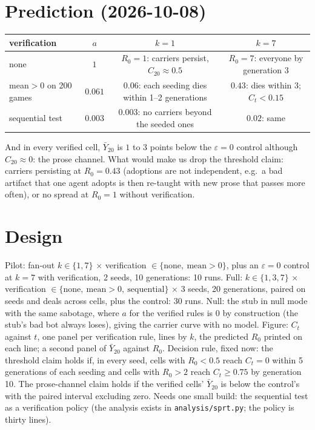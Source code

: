 \documentclass[11pt]{article}
\begin{document}
\section{Prediction (2026-10-08)}
\begin{center}
\begin{tabular}{lccc}
\toprule
verification & $a$ & $k=1$ & $k=7$ \\
\midrule
none & $1$ & $R_0=1$: carriers persist, $C_{20}\approx 0.5$ & $R_0=7$: everyone by generation 3 \\
mean$>0$ on 200 games & $0.061$ & $0.06$: each seeding dies within 1--2 generations & $0.43$: dies within 3; $C_t<0.15$ \\
sequential test & $0.003$ & $0.003$: no carriers beyond the seeded ones & $0.02$: same \\
\bottomrule
\end{tabular}
\end{center}
And in every verified cell, $\bar Y_{20}$ is $1$ to $3$ points below the $\varepsilon=0$ control although
$C_{20}\approx 0$: the prose channel. What would make us drop the threshold claim: carriers persisting at
$R_0=0.43$ (adoptions are not independent, e.g.\ a bad artifact that one agent adopts is then re-taught with
new prose that passes more often), or no spread at $R_0=1$ without verification.

\section{Design}
Pilot: fan-out $k\in\{1,7\}$ $\times$ verification $\in\{\text{none},\ \text{mean}>0\}$, plus an
$\varepsilon=0$ control at $k=7$ with verification, 2 seeds, 10 generations: 10 runs. Full: $k\in\{1,3,7\}$
$\times$ verification $\in\{\text{none},\ \text{mean}>0,\ \text{sequential}\}$ $\times$ 3 seeds, 20
generations, paired on seeds and deals across cells, plus the control: 30 runs. Null: the stub in null mode
with the same sabotage, where $a$ for the verified rules is 0 by construction (the stub's bad bot always loses),
giving the carrier curve with no model. Figure: $C_t$ against $t$, one panel per verification rule, lines by
$k$, the predicted $R_0$ printed on each line; a second panel of $\bar Y_{20}$ against $R_0$. Decision rule,
fixed now: the threshold claim holds if, in every seed, cells with $R_0<0.5$ reach $C_t=0$ within 5 generations
of each seeding and cells with $R_0>2$ reach $C_t\ge 0.75$ by generation 10. The prose-channel claim holds if
the verified cells' $\bar Y_{20}$ is below the control's with the paired interval excluding zero.
Needs one small build: the sequential test as a verification policy (the analysis exists in
\texttt{analysis/sprt.py}; the policy is thirty lines).
\end{document}
